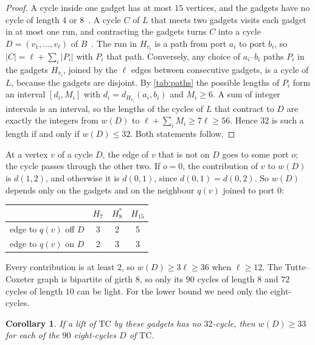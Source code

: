 \documentclass[11pt]{amsart}
\newtheorem{corollary}[theorem]{Corollary}
\theoremstyle{remark}
\newcommand{\Hseven}{H_7}
\newcommand{\Hfifteen}{H_{15}}
\newcommand{\Height}{H_8^{*}}
\newcommand{\TC}{\mathrm{TC}}
\begin{document}
\begin{proof}
A cycle inside one gadget has at most $15$ vertices, and the gadgets have no
cycle of length $4$ or $8$~\cite[Table~2]{Marszalek2026a}. A cycle $C$ of $L$
that meets two gadgets visits each gadget in at most one run, and contracting
the gadgets turns $C$ into a cycle $D=(v_1,\dots,v_\ell)$ of
$B$~\cite[Lemma~2.1]{Marszalek2026a}. The run in $H_{v_i}$ is a path from port
$a_i$ to port $b_i$, so $|C|=\ell+\sum_i |P_i|$ with $P_i$ that path.
Conversely, any choice of $a_i$--$b_i$ paths $P_i$ in the gadgets $H_{v_i}$,
joined by the $\ell$ edges between consecutive gadgets, is a cycle of $L$,
because the gadgets are disjoint. By \cref{tab:paths} the possible lengths of
$P_i$ form an interval $[d_i,M_i]$ with $d_i=d_{H_{v_i}}(a_i,b_i)$ and
$M_i\ge 6$. A sum of integer intervals is an interval, so the lengths of the
cycles of $L$ that contract to $D$ are exactly the integers from $w(D)$ to
$\ell+\sum_i M_i\ge 7\ell\ge 56$. Hence $32$ is such a length if and only if
$w(D)\le 32$. Both statements follow.
\end{proof}

At a vertex $v$ of a cycle $D$, the edge of $v$ that is not on $D$ goes to some
port $o$; the cycle passes through the other two. If $o=0$, the contribution
of $v$ to $w(D)$ is $d(1,2)$, and otherwise it is $d(0,1)$, since
$d(0,1)=d(0,2)$. So $w(D)$ depends only on the gadgets and on the neighbour
$q(v)$ joined to port $0$:
\begin{center}
\begin{tabular}{@{}lccc@{}}
\toprule
& $\Hseven$ & $\Height$ & $\Hfifteen$\\
\midrule
edge to $q(v)$ off $D$ & 3 & 2 & 5\\
edge to $q(v)$ on $D$  & 2 & 3 & 3\\
\bottomrule
\end{tabular}
\end{center}
Every contribution is at least $2$, so $w(D)\ge 3\ell\ge 36$ when $\ell\ge 12$.
The Tutte--Coxeter graph is bipartite of girth $8$, so only its $90$ cycles of
length $8$ and $72$ cycles of length $10$ can be light. For the lower bound we
need only the eight-cycles.

\begin{corollary}\label{cor:necessary}
If a lift of $\TC$ by these gadgets has no $32$-cycle, then $w(D)\ge 33$ for
each of the $90$ eight-cycles $D$ of $\TC$.
\end{corollary}

\end{document}
